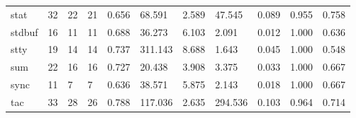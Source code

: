 \begin{longtable}{lp{1.8cm}p{1.8cm}p{1.8cm}p{1.8cm}p{1.8cm}p{1.8cm}p{1.8cm}p{1.8cm}p{1.8cm}p{1.8cm}}
stat      &                           32 &                 22 &                                21 &                                      0.656 &                                 68.591 &                                        2.589 &                            47.545 &                                   0.089 &                              0.955 &                                              0.758 \\
stdbuf    &                           16 &                 11 &                                11 &                                      0.688 &                                 36.273 &                                        6.103 &                             2.091 &                                   0.012 &                              1.000 &                                              0.636 \\
stty      &                           19 &                 14 &                                14 &                                      0.737 &                                311.143 &                                        8.688 &                             1.643 &                                   0.045 &                              1.000 &                                              0.548 \\
sum       &                           22 &                 16 &                                16 &                                      0.727 &                                 20.438 &                                        3.908 &                             3.375 &                                   0.033 &                              1.000 &                                              0.667 \\
sync      &                           11 &                  7 &                                 7 &                                      0.636 &                                 38.571 &                                        5.875 &                             2.143 &                                   0.018 &                              1.000 &                                              0.667 \\
tac       &                           33 &                 28 &                                26 &                                      0.788 &                                117.036 &                                        2.635 &                           294.536 &                                   0.103 &                              0.964 &                                              0.714 \\

\end{longtable}
